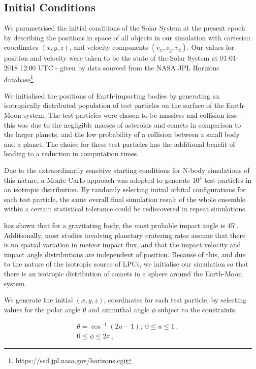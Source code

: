 \subsection{Initial Conditions}

We parametrised the initial conditions of the Solar System at the present epoch by describing the positions in space of all objects in our simulation with cartesian coordinates $(x,y,z)$, and velocity components $(v_x, v_y, v_z)$. Our values for position and velocity were taken to be the state of the Solar System at 01-01-2018 12:00 UTC - given by data sourced from the NASA JPL Horizons database\footnote{https://ssd.jpl.nasa.gov/horizons.cgi}.

We initialised the positions of Earth-impacting bodies by generating an isotropically distributed population of test particles on the surface of the Earth-Moon system. The test particles were chosen to be massless and collision-less -  this was due to the negligible masses of asteroids and comets in comparison to the larger planets, and the low probability of a collision between a small body and a planet. The choice for these test particles has the additional benefit of leading to a reduction in computation times.

Due to the extraordinarily sensitive starting conditions for N-body simulations of this nature, a Monte Carlo approach was adopted to generate $10^4$ test particles in an isotropic distribution. By randomly selecting initial orbital configurations for each test particle, the same overall final simulation result of the whole ensemble within a certain statistical tolerance could be rediscovered in repeat simulations.

\cite{shoemaker1962interpretation} has shown that for a gravitating body, the most probable impact angle is 45$^\circ$. Additionally, most studies involving planetary cratering rates assume that there is no spatial variation in meteor impact flux, and that the impact velocity and impact angle distributions are independent of position. Because of this, and due to the nature of the isotropic source of LPCs, we initialise our simulation so that there is an isotropic distribution of comets in a sphere around the Earth-Moon system.

We generate the initial $(x,y,z)$, coordinates for each test particle, by selecting values for the polar angle $\theta$ and azimuthal angle $\phi$ subject to the constraints,

\begin{equation}
  \begin{gathered}
    \theta = \cos^{-1}(2u-1); \; 0 \leq u \leq 1~, \\
    0 \leq \phi \leq 2\pi~,
\end{gathered}  
\end{equation}

